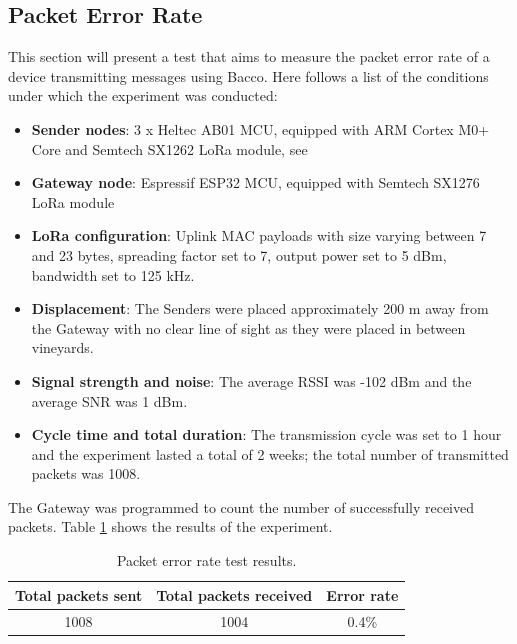 \subsection{Packet Error Rate}
This section will present a test that aims to measure the packet error rate of a device transmitting messages using
Bacco. Here follows a list of the conditions under which the experiment was conducted:
\begin{itemize}
    \item \textbf{Sender nodes}: 3 x Heltec AB01 MCU, equipped with ARM Cortex M0+ Core and Semtech SX1262 LoRa module,
        see \cite{ab01}
    \item \textbf{Gateway node}: Espressif ESP32 MCU, equipped with Semtech SX1276 LoRa module
    \item \textbf{LoRa configuration}: Uplink MAC payloads with size varying between 7 and 23 bytes, spreading factor set to 7,
        output power set to 5 dBm, bandwidth set to 125 kHz.
    \item \textbf{Displacement}: The Senders were placed approximately 200 m away from the Gateway with no clear line
        of sight as they were placed in between vineyards.
    \item \textbf{Signal strength and noise}: The average \gls{RSSI} was -102 dBm and the average \gls{SNR} was 1 dBm.
    \item \textbf{Cycle time and total duration}: The transmission cycle was set to 1 hour and the experiment
        lasted a total of 2 weeks; the total number of transmitted packets was 1008.
\end{itemize}
The Gateway was programmed to count the number of successfully received packets. Table \ref{tab: error rate results}
shows the results of the experiment.
\begin{table}[ht]
    \caption{Packet error rate test results.}
    \label{tab: error rate results}
    \centering
    \setlength{\extrarowheight}{7pt}
    \begin{tabular}{ |c|c|c| }
        \hline
        \textbf{Total packets sent} & \textbf{Total packets received} & \textbf{Error rate}\\
        \hline
        1008 & 1004 & 0.4\%\\
        \hline
    \end{tabular}
\end{table}
